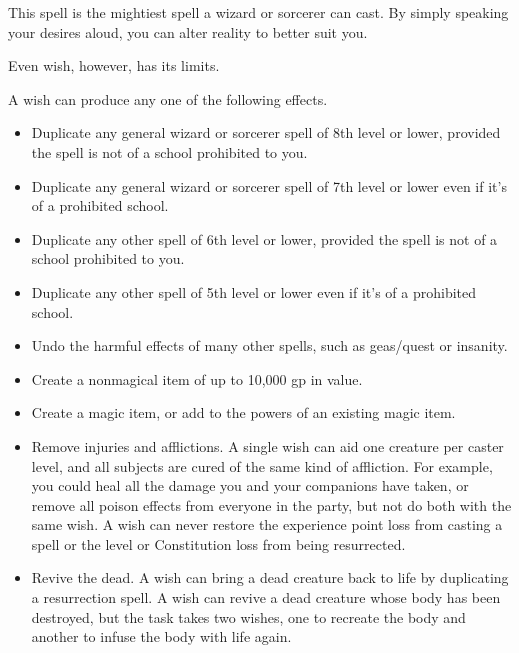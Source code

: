 \begin{spellheader}
\end{spellheader}
\begin{spelltargetinginfo}
\end{spelltargetinginfo}
\begin{spellcontent}
    \spelleffect This spell is the mightiest spell a wizard or sorcerer can cast. By simply speaking your desires aloud, you can alter reality to better suit you.
    \par Even wish, however, has its limits.
    \par A wish can produce any one of the following effects.
    \begin{itemize}
        \item Duplicate any general wizard or sorcerer spell of 8th level or lower, provided the spell is not of a school prohibited to you.
        \item Duplicate any general wizard or sorcerer spell of 7th level or lower even if it's of a prohibited school.
        \item Duplicate any other spell of 6th level or lower, provided the spell is not of a school prohibited to you.
        \item Duplicate any other spell of 5th level or lower even if it's of a prohibited school. 
        \item Undo the harmful effects of many other spells, such as geas/quest or insanity.
        \item Create a nonmagical item of up to 10,000 gp in value.
        \item Create a magic item, or add to the powers of an existing magic item.
        \item Remove injuries and afflictions. A single wish can aid one creature per caster level, and all subjects are cured of the same kind of affliction. For example, you could heal all the damage you and your companions have taken, or remove all poison effects from everyone in the party, but not do both with the same wish. A wish can never restore the experience point loss from casting a spell or the level or Constitution loss from being resurrected.
        \item Revive the dead. A wish can bring a dead creature back to life by duplicating a resurrection spell. A wish can revive a dead creature whose body has been destroyed, but the task takes two wishes, one to recreate the body and another to infuse the body with life again.

\end{itemize}
\end{spellcontent}
